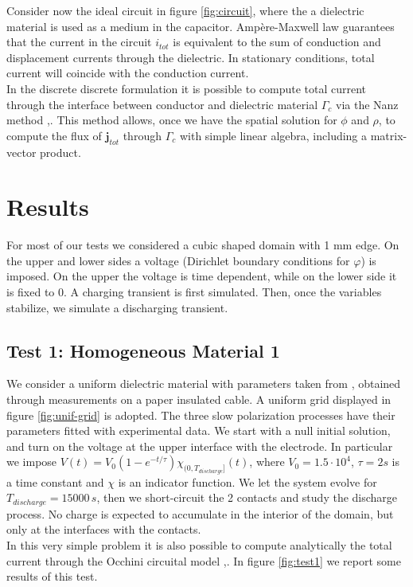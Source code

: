 \documentclass[11pt,a4paper]{article}
\begin{document}
Consider now the ideal circuit in figure \ref{fig:circuit}, where the a dielectric material is used as a medium in the capacitor. Ampère-Maxwell law guarantees that the current in the circuit \(i_{tot}\) is equivalent to the sum of conduction and displacement currents through the dielectric. In stationary conditions, total current will coincide with the conduction current.\\
In the discrete discrete formulation it is possible to compute total current through the interface between conductor and dielectric material \(\Gamma_c\) via the Nanz method \cite{Nanz},\cite{HUGHES2000467}. This method allows, once we have the spatial solution for \(\phi\) and \(\rho\), to compute the flux of \(\mathbf{j}_{tot}\) through \(\Gamma_{c}\) with simple linear algebra, including a matrix-vector product. 

\section{Results}
For most of our tests we considered a cubic shaped domain with 1 mm edge. On the upper and lower sides a voltage (Dirichlet boundary conditions for \(\varphi\)) is imposed. On the upper the voltage is time dependent, while on the lower side it is fixed to 0. A charging transient is first simulated. Then, once the variables stabilize, we simulate a discharging transient.
\subsection{Test 1: Homogeneous Material 1}
We consider a uniform dielectric material with parameters taken from \cite{en14248323}, obtained through measurements on a paper insulated cable. A uniform grid displayed in figure \ref{fig:unif-grid} is adopted. The three slow polarization processes have their parameters fitted with experimental data. We start with a null initial solution, and turn on the voltage at the upper interface with the electrode. In particular we impose \(V(t)=V_0(1-e^{-t/\tau})\chi_{(0,T_{discharge}]}(t)\), where \(V_0 = 1.5\cdot 10^4\), \(\tau=2 s\) is a time constant and \(\chi\) is an indicator function. We let the system evolve for \(T_{discharge}=15000\,s\), then we short-circuit the 2 contacts and study the discharge process. No charge is expected to accumulate in the interior of the domain, but only at the interfaces with the contacts.\\
In this very simple problem it is also possible to compute analytically the total current through the Occhini circuital model \cite{4073280},\cite{en14248323}. In figure \ref{fig:test1} we report some results of this test.
\end{document}
